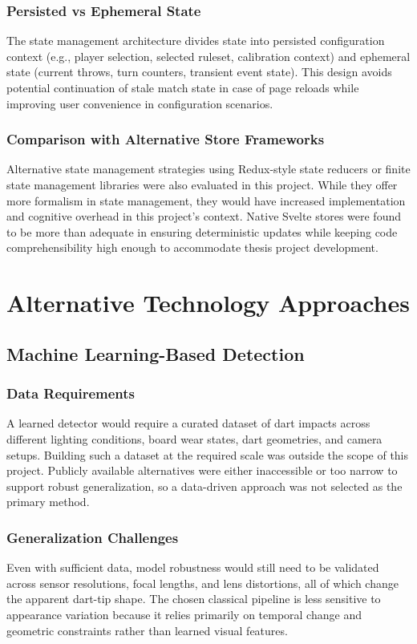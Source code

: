 \subsubsection{Persisted vs Ephemeral State}
The state management architecture divides state into persisted configuration context (e.g., player selection, selected ruleset, calibration context) and ephemeral state (current throws, turn counters, transient event state). This design avoids potential continuation of stale match state in case of page reloads while improving user convenience in configuration scenarios.

\subsubsection{Comparison with Alternative Store Frameworks}
Alternative state management strategies using Redux-style state reducers or finite state management libraries were also evaluated in this project. While they offer more formalism in state management, they would have increased implementation and cognitive overhead in this project's context. Native Svelte stores were found to be more than adequate in ensuring deterministic updates while keeping code comprehensibility high enough to accommodate thesis project development.
\setauthor{\secondauthor}
\section{Alternative Technology Approaches}

\subsection{Machine Learning-Based Detection}

\subsubsection{Data Requirements}
A learned detector would require a curated dataset of dart impacts across different lighting conditions, board wear states, dart geometries, and camera setups. Building such a dataset at the required scale was outside the scope of this project. Publicly available alternatives were either inaccessible or too narrow to support robust generalization, so a data-driven approach was not selected as the primary method.

\subsubsection{Generalization Challenges}
Even with sufficient data, model robustness would still need to be validated across sensor resolutions, focal lengths, and lens distortions, all of which change the apparent dart-tip shape. The chosen classical pipeline is less sensitive to appearance variation because it relies primarily on temporal change and geometric constraints rather than learned visual features.


